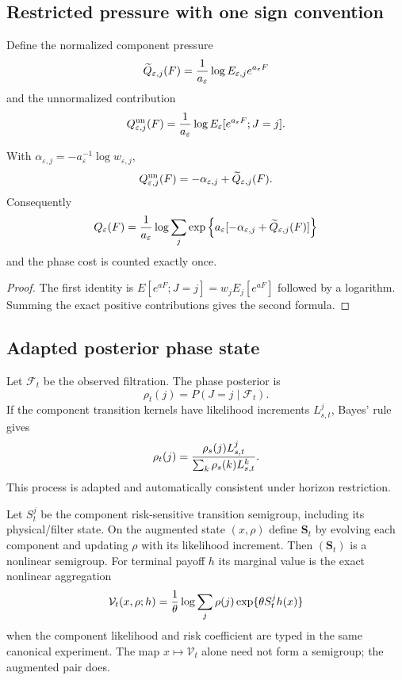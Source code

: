 \subsection{Restricted pressure with one sign convention}

Define the normalized component pressure
\[
 \widetilde Q_{\varepsilon,j}(F)
 ={1\over a_\varepsilon}
 \log E_{\varepsilon,j}e^{a_\varepsilon F}
\]
and the unnormalized contribution
\[
 Q_{\varepsilon,j}^{\rm un}(F)
 ={1\over a_\varepsilon}
 \log E_\varepsilon[e^{a_\varepsilon F};J=j].
\]

\begin{lemma}
\label{lem:r17-d1-sign}
With
$\alpha_{\varepsilon,j}
 =-a_\varepsilon^{-1}\log w_{\varepsilon,j}$,
\[
 Q_{\varepsilon,j}^{\rm un}(F)
 =-\alpha_{\varepsilon,j}
  +\widetilde Q_{\varepsilon,j}(F).
\]
Consequently
\[
 Q_\varepsilon(F)
 ={1\over a_\varepsilon}\log
 \sum_j\exp\left\{
a_\varepsilon[-\alpha_{\varepsilon,j}
 +\widetilde Q_{\varepsilon,j}(F)]\right\}
\]
and the phase cost is counted exactly once.
\end{lemma}

\begin{proof}
The first identity is
$E[e^{aF};J=j]=w_jE_j[e^{aF}]$ followed by a logarithm.  Summing the exact
positive contributions gives the second formula.
\end{proof}

\subsection{Adapted posterior phase state}

Let $\mathcal F_t$ be the observed filtration.  The phase posterior is
\[
 \rho_t(j)=P(J=j\mid\mathcal F_t).
\]
If the component transition kernels have likelihood increments
$L_{s,t}^j$, Bayes' rule gives
\[
 \rho_t(j)=
 {\rho_s(j)L_{s,t}^j
  \over\sum_k\rho_s(k)L_{s,t}^k}.
\]
This process is adapted and automatically consistent under horizon
restriction.

\begin{theorem}
\label{thm:r17-d1-semigroup}
Let $S_t^j$ be the component risk-sensitive transition semigroup, including
its physical/filter state.  On the augmented state $(x,\rho)$ define
$\mathbf S_t$ by evolving each component and updating $\rho$ with its
likelihood increment.  Then $(\mathbf S_t)$ is a nonlinear semigroup.
For terminal payoff $h$ its marginal value is the exact nonlinear aggregation
\[
 \mathcal V_t(x,\rho;h)
 ={1\over\theta}
 \log\sum_j\rho(j)
 \exp\{\theta S_t^jh(x)\}
\]
when the component likelihood and risk coefficient are typed in the same
canonical experiment.  The map $x\mapsto\mathcal V_t$ alone need not
form a semigroup; the augmented pair does.
\end{theorem}

